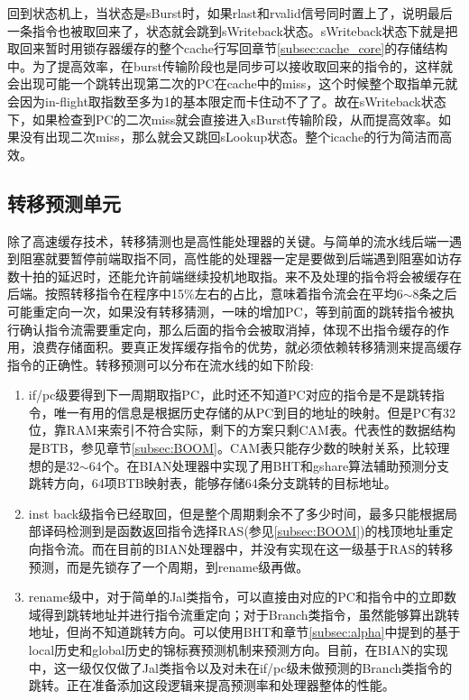 回到状态机上，当状态是sBurst时，如果rlast和rvalid信号同时置上了，说明最后一条指令也被取回来了，状态就会跳到sWriteback状态。sWriteback状态下就是把取回来暂时用锁存器缓存的整个cache行写回章节\ref{subsec:cache_core}的存储结构中。为了提高效率，在burst传输阶段也是同步可以接收取回来的指令的，这样就会出现可能一个跳转出现第二次的PC在cache中的miss，这个时候整个取指单元就会因为in-flight取指数至多为1的基本限定而卡住动不了了。故在sWriteback状态下，如果检查到PC的二次miss就会直接进入sBurst传输阶段，从而提高效率。如果没有出现二次miss，那么就会又跳回sLookup状态。整个icache的行为简洁而高效。

\subsection{转移预测单元}
除了高速缓存技术，转移猜测也是高性能处理器的关键。与简单的流水线后端一遇到阻塞就要暂停前端取指不同，高性能的处理器一定是要做到后端遇到阻塞如访存数十拍的延迟时，还能允许前端继续投机地取指。来不及处理的指令将会被缓存在后端。按照转移指令在程序中15\%左右的占比，意味着指令流会在平均6$ \sim $8条之后可能重定向一次，如果没有转移猜测，一味的增加PC，等到前面的跳转指令被执行确认指令流需要重定向，那么后面的指令会被取消掉，体现不出指令缓存的作用，浪费存储面积。要真正发挥缓存指令的优势，就必须依赖转移猜测来提高缓存指令的正确性。转移预测可以分布在流水线的如下阶段:
\begin{enumerate}[label=(\alph*)]
	\item if/pc级要得到下一周期取指PC，此时还不知道PC对应的指令是不是跳转指令，唯一有用的信息是根据历史存储的从PC到目的地址的映射。但是PC有32位，靠RAM来索引不符合实际，剩下的方案只剩CAM表。代表性的数据结构是BTB，参见章节\ref{subsec:BOOM}。CAM表只能存少数的映射关系，比较理想的是32$ \sim $64个。在BIAN处理器中实现了用BHT和gshare算法辅助预测分支跳转方向，64项BTB映射表，能够存储64条分支跳转的目标地址。
	\item inst back级指令已经取回，但是整个周期剩余不了多少时间，最多只能根据局部译码检测到是函数返回指令选择RAS(参见\ref{subsec:BOOM})的栈顶地址重定向指令流。而在目前的BIAN处理器中，并没有实现在这一级基于RAS的转移预测，而是先锁存了一个周期，到rename级再做。
	\item rename级中，对于简单的Jal类指令，可以直接由对应的PC和指令中的立即数域得到跳转地址并进行指令流重定向；对于Branch类指令，虽然能够算出跳转地址，但尚不知道跳转方向。可以使用BHT和章节\ref{subsec:alpha}中提到的基于local历史和global历史的锦标赛预测机制来预测方向。目前，在BIAN的实现中，这一级仅仅做了Jal类指令以及对未在if/pc级未做预测的Branch类指令的跳转。正在准备添加这段逻辑来提高预测率和处理器整体的性能。
\end{enumerate}

